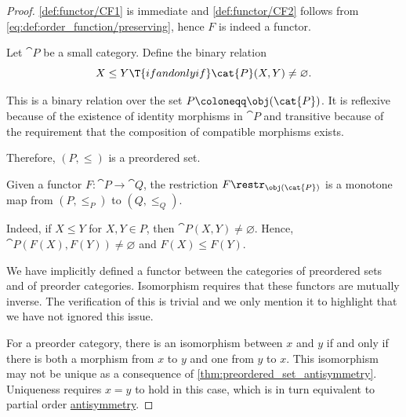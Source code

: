\begin{proof}
  \ref{def:functor/CF1} is immediate and \ref{def:functor/CF2} follows from \eqref{eq:def:order_function/preserving}, hence \( F \) is indeed a functor.

   Let \( \cat{P} \) be a small category. Define the binary relation
  \begin{equation*}
    X \leq Y \T{if and only if} \cat{P}(X, Y) \neq \varnothing.
  \end{equation*}

  This is a binary relation over the set \( P \coloneqq \obj(\cat{P}) \). It is reflexive because of the existence of identity morphisms in \( \cat{P} \) and transitive because of the requirement that the composition of compatible morphisms exists.

  Therefore, \( (P, \leq) \) is a preordered set.

  Given a functor \( F: \cat{P} \to \cat{Q} \), the restriction \( F\restr_{\obj(\cat{P})} \) is a monotone map from \( (P, \leq_P) \) to \( (Q, \leq_Q) \).

  Indeed, if \( X \leq Y \) for \( X, Y \in P \), then \( \cat{P}(X, Y) \neq \varnothing \). Hence, \( \cat{P}(F(X), F(Y)) \neq \varnothing \) and \( F(X) \leq F(Y) \).

   We have implicitly defined a functor between the categories of preordered sets and of preorder categories. Isomorphism requires that these functors are mutually inverse. The verification of this is trivial and we only mention it to highlight that we have not ignored this issue.

   For a preorder category, there is an isomorphism between \( x \) and \( y \) if and only if there is both a morphism from \( x \) to \( y \) and one from \( y \) to \( x \). This isomorphism may not be unique as a consequence of \cref{thm:preordered_set_antisymmetry}. Uniqueness requires \( x = y \) to hold in this case, which is in turn equivalent to partial order \hyperref[def:binary_relation/antisymmetric]{antisymmetry}.
\end{proof}

